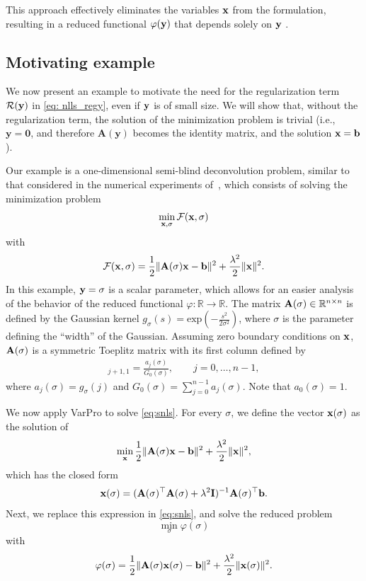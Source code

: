 \documentclass[onefignum,onetabnum]{siamart171218}
\newcommand{\bA}{{\bf A}}
\newcommand{\bI}{{\bf I}}
\newcommand{\bb}{{\bf b}}
\newcommand{\bx}{{\bf x}}
\newcommand{\by}{{\bf y}}
\newcommand{\calF}{\mathcal{F}}
\begin{document}
This approach effectively eliminates the variables $\bx$ from the formulation, resulting in a reduced functional $\varphi(\by)$ that depends solely on $\by$%
.

\subsection{Motivating example}\label{sec: motivating example}
We now present an example to motivate the need for %
the regularization term $\mathcal{R}(\by)$ in \eqref{eq: nlls_regy}, even if $\by$ is of small size. We will show that, without the regularization term, the solution of the minimization problem is trivial (i.e., $\mathbf{y}=\boldsymbol{0}$, and therefore $\mathbf{A}(\mathbf{y})$ becomes the identity matrix, and the solution $\bx=\bb$). 

Our example is a one-dimensional semi-blind deconvolution problem, similar to that considered in the numerical experiments of~\cite{Espanol_2023}, which consists of solving the minimization problem
\begin{equation}\label{eq:snls}
\min_{\bx, \sigma}  \calF(\bx,\sigma) 
\end{equation}
with $$\calF(\bx,\sigma) = \frac{1}{2}\| \bA(\sigma)\bx - \bb \|^2 + \frac{\lambda^2}{2} \|\bx\|^2.$$
In this example, $\by = \sigma$ is a scalar parameter, which allows for an easier analysis of the behavior of the reduced functional $\varphi\colon \mathbb{R} \to \mathbb{R}$. The matrix $\bA(\sigma)\in \mathbb{R}^{n\times n}$ is defined by the Gaussian kernel
$g_\sigma(s) = \mbox{exp}\left(-\frac{s^2}{2\sigma^2}\right)$, where $\sigma$ is the parameter defining the ``width'' of the Gaussian. Assuming zero boundary conditions on $\bx$, $\bA(\sigma)$ is a symmetric Toeplitz matrix with its first column defined by
\begin{align}
   [\bA(\sigma)]_{j+1,1}= \frac{a_j(\sigma)}{G_0(\sigma)}  , \qquad j=0, \dots, n-1,\nonumber
\end{align}
where $a_j(\sigma)=g_\sigma(j)$ and  $G_0(\sigma) = \sum_{j=0}^{n-1} a_j(\sigma)$. Note that $a_0(\sigma)=1$.

We now apply VarPro to solve \eqref{eq:snls}. For every $\sigma$, we define the vector $\bx(\sigma)$ as the solution of
\[ \min_{\bx} \frac{1}{2}\|\bA(\sigma) \bx - \bb \|^2 + \frac{\lambda^2}{2}\| \bx\|^2,\]
which has the closed form
\[\bx(\sigma) = (\bA(\sigma)^\top \bA(\sigma) + \lambda^2 \bI)^{-1} \bA(\sigma)^\top \bb.\]
Next, we  replace this expression  in \eqref{eq:snls}, and solve the reduced problem
\begin{equation*}
\min_\sigma  \varphi(\sigma) 
\end{equation*}
with 
\begin{equation}\label{eq: Tik-problem}
\varphi(\sigma) = \frac{1}{2}\|\bA(\sigma) \bx(\sigma) - \bb\|^2 + \frac{\lambda^2}{2} \| \bx(\sigma)\|^2.
\end{equation}
\end{document}
